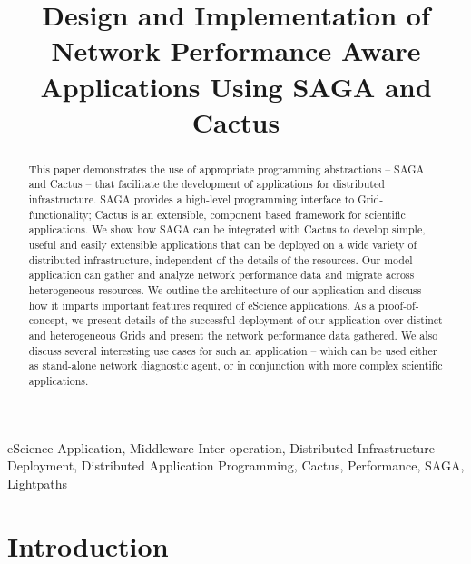 \documentclass[conference,final]{IEEEtran}
\begin{document}
\title{\large Design and Implementation of Network Performance Aware
  Applications Using SAGA and Cactus}

\author{
   }

\maketitle

\begin{abstract}
  This paper demonstrates the use of appropriate programming
  abstractions -- SAGA and Cactus -- that facilitate the development
  of applications for distributed infrastructure.  SAGA provides a
  high-level programming interface to Grid-functionality; Cactus is an
  extensible, component based framework for scientific applications.
  We show how SAGA can be integrated with Cactus to develop simple,
  useful and easily extensible applications that can be deployed on a
  wide variety of distributed infrastructure, independent of the
  details of the resources. Our model application can gather and
  analyze network performance data and migrate across heterogeneous
  resources.  We outline the architecture of our application and
  discuss how it imparts important features required of eScience
  applications.  As a proof-of-concept, we present details of the
  successful deployment of our application over distinct and
  heterogeneous Grids and present the network performance data
  gathered.  We also discuss several interesting use cases for such an
  application -- which can be used either as stand-alone network
  diagnostic agent, or in conjunction with more complex scientific
  applications.
\end{abstract}

\begin{keywords}
  eScience Application, Middleware Inter-operation, Distributed
  Infrastructure Deployment, Distributed Application Programming,
  Cactus, Performance, SAGA, Lightpaths
\end{keywords}

\section{Introduction}
\end{document}
